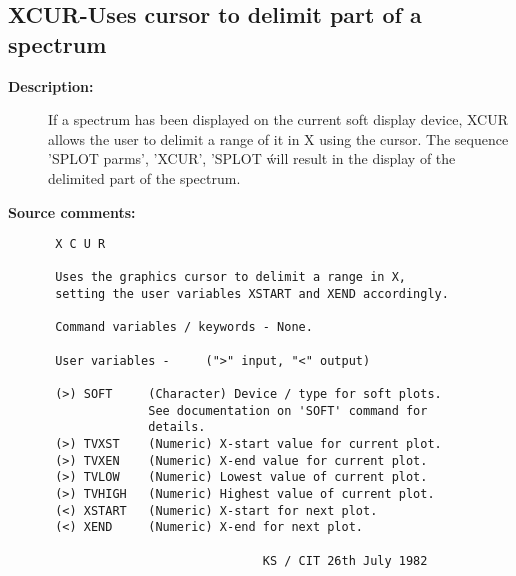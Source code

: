 \subsection{XCUR-\label{XCUR}Uses cursor to delimit part of a spectrum}
\begin{description}

\item [{\bf Description:}]
 If a spectrum has been displayed on the current soft display
 device, XCUR allows the user to delimit a range of it in X using
 the cursor.  The sequence 'SPLOT parms', 'XCUR', 'SPLOT \' will
 result in the display of the delimited part of the spectrum.

\item [{\bf Source comments:}]
\begin{verbatim}
 X C U R

 Uses the graphics cursor to delimit a range in X,
 setting the user variables XSTART and XEND accordingly.

 Command variables / keywords - None.

 User variables -     (">" input, "<" output)

 (>) SOFT     (Character) Device / type for soft plots.
              See documentation on 'SOFT' command for
              details.
 (>) TVXST    (Numeric) X-start value for current plot.
 (>) TVXEN    (Numeric) X-end value for current plot.
 (>) TVLOW    (Numeric) Lowest value of current plot.
 (>) TVHIGH   (Numeric) Highest value of current plot.
 (<) XSTART   (Numeric) X-start for next plot.
 (<) XEND     (Numeric) X-end for next plot.

                              KS / CIT 26th July 1982
\end{verbatim}
\end{description}
